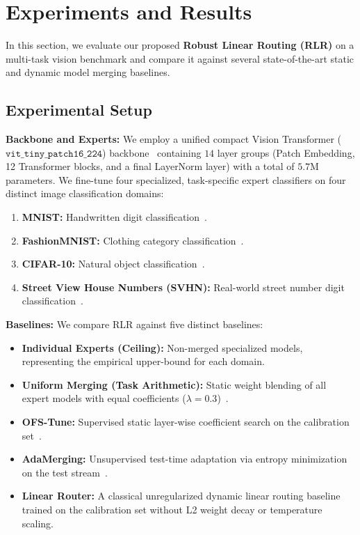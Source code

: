 \section{Experiments and Results}
\label{sec:experiments}

In this section, we evaluate our proposed \textbf{Robust Linear Routing (RLR)} on a multi-task vision benchmark and compare it against several state-of-the-art static and dynamic model merging baselines. 

\subsection{Experimental Setup}

\textbf{Backbone and Experts:} We employ a unified compact Vision Transformer ($\mathtt{vit\_tiny\_patch16\_224}$) backbone~\cite{Dosovitskiy2021} containing $14$ layer groups (Patch Embedding, 12 Transformer blocks, and a final LayerNorm layer) with a total of $5.7$M parameters. We fine-tune four specialized, task-specific expert classifiers on four distinct image classification domains:
\begin{enumerate}
    \item \textbf{MNIST:} Handwritten digit classification~\cite{shwartz2014understanding}.
    \item \textbf{FashionMNIST:} Clothing category classification~\cite{Srivastava2014}.
    \item \textbf{CIFAR-10:} Natural object classification~\cite{krizhevsky2009learning}.
    \item \textbf{Street View House Numbers (SVHN):} Real-world street number digit classification~\cite{netzer2011reading}.
\end{enumerate}

\textbf{Baselines:} We compare RLR against five distinct baselines:
\begin{itemize}
    \item \textbf{Individual Experts (Ceiling):} Non-merged specialized models, representing the empirical upper-bound for each domain.
    \item \textbf{Uniform Merging (Task Arithmetic):} Static weight blending of all expert models with equal coefficients ($\lambda=0.3$)~\cite{Ilharco2022}.
    \item \textbf{OFS-Tune:} Supervised static layer-wise coefficient search on the calibration set~\cite{OFS2025}.
    \item \textbf{AdaMerging:} Unsupervised test-time adaptation via entropy minimization on the test stream~\cite{AdaMerging2023}.
    \item \textbf{Linear Router:} A classical unregularized dynamic linear routing baseline trained on the calibration set without L2 weight decay or temperature scaling.
\end{itemize}

